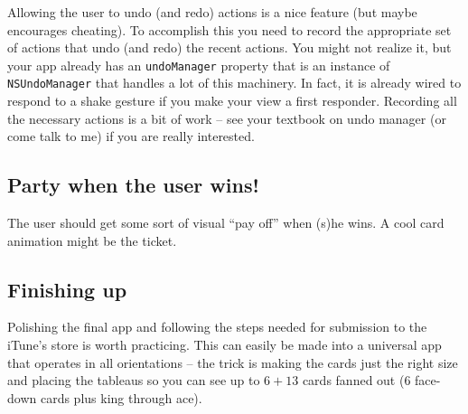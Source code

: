 \documentclass[11pt]{article}
\begin{document}
Allowing the user to undo (and redo) actions is a nice feature (but
maybe encourages cheating).
To accomplish this you need to
record the appropriate set of actions that undo (and redo) the
recent actions. You might not realize it, but your app already has
an {\tt undoManager} property that is an instance of
{\tt NSUndoManager} that handles a lot of this machinery.
In fact, it is already wired to respond to a shake gesture if you
make your view a first responder.
Recording all the necessary actions is a bit of work -- see your textbook
on undo manager (or come talk to me) if you are really interested.

\subsection{Party when the user wins!}

The user should get some sort of visual ``pay off'' when
(s)he wins. A cool card animation might be the ticket.

\subsection{Finishing up}

Polishing the final app and following the steps needed
for submission to the iTune's store is worth practicing.
This can easily be made into a universal app that operates
in all orientations -- the trick
is making the cards just the right size and placing the
tableaus so you can see up to $6 + 13$ cards fanned out
(6 face-down cards plus king through ace).
\end{document}
